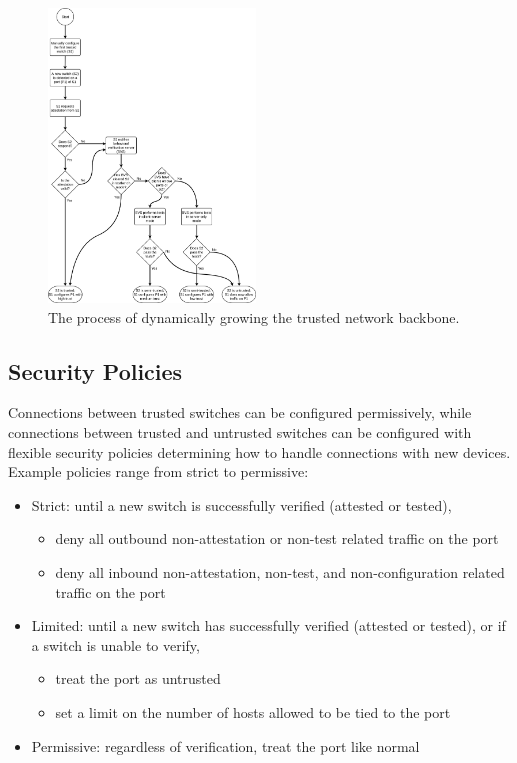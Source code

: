 \documentclass[journal]{IEEEtran}
\begin{document}
\begin{figure}[htbp]
\centerline{\includegraphics[width=0.49\textwidth]{images/switch-addition}}
\caption{The process of dynamically growing the trusted network backbone.}
\label{fig:switch-addition}
\end{figure}

\subsection{Security Policies}\label{sec:policies}
Connections between trusted switches can
be configured permissively, while connections between trusted and untrusted switches can be
configured with flexible security policies determining how to handle connections with new devices.
Example policies range from strict to permissive:
\begin{itemize}
  \item Strict: until a new switch is successfully verified (attested or tested),
  \begin{itemize}
    \item deny all outbound non-attestation or non-test related traffic on the port
    \item deny all inbound non-attestation, non-test, and non-configuration related traffic on the
    port
  \end{itemize}
  \item Limited: until a new switch has successfully verified (attested or tested), or if a switch
  is unable to verify,
  \begin{itemize}
    \item treat the port as untrusted
    \item set a limit on the number of hosts allowed to be tied to the port
  \end{itemize}
  \item Permissive: regardless of verification, treat the port like normal
\end{itemize}
\end{document}
